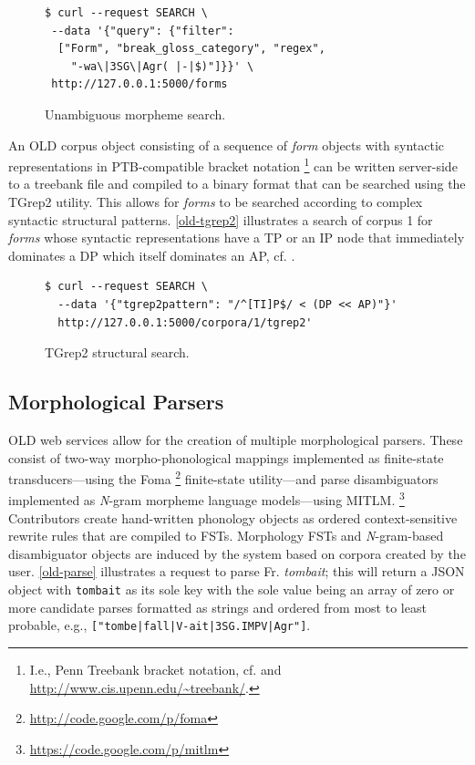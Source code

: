 \documentclass[11pt]{article}
\begin{document}
\begin{figure}[h]
\scriptsize
\begin{verbatim}
$ curl --request SEARCH \
 --data '{"query": {"filter":
  ["Form", "break_gloss_category", "regex",
    "-wa\|3SG\|Agr( |-|$)"]}}' \
 http://127.0.0.1:5000/forms
\end{verbatim}
\normalsize
\caption{Unambiguous morpheme search.}
\label{old-morpheme-search}
\end{figure}

An OLD corpus object consisting of a sequence of \emph{form} objects with syntactic
representations in PTB-compatible bracket notation%
\footnote{I.e., Penn Treebank bracket notation, cf. \cite{taylor2003penn} and
\url{http://www.cis.upenn.edu/~treebank/}.} %
can be written server-side to a treebank file and compiled to a binary format
that can be searched using the TGrep2 utility. This allows for \emph{forms} to be
searched according to complex syntactic structural patterns. \autoref{old-tgrep2}
illustrates a search of corpus 1 for \emph{forms} whose syntactic
representations have a TP or an IP node that immediately dominates a DP which
itself dominates an AP, cf.  \cite{rohde2005tgrep2}.

\begin{figure}[h]
\scriptsize
\begin{verbatim}
$ curl --request SEARCH \
  --data '{"tgrep2pattern": "/^[TI]P$/ < (DP << AP)"}'
  http://127.0.0.1:5000/corpora/1/tgrep2'
\end{verbatim}
\normalsize
\caption{TGrep2 structural search.}
\label{old-tgrep2}
\end{figure}


\subsection{Morphological Parsers}

OLD web services allow for the creation of multiple morphological parsers.
These consist of two-way morpho-phonological mappings implemented as
finite-state transducers---using the Foma%
\footnote{\url{http://code.google.com/p/foma}} %
finite-state utility---and parse disambiguators implemented as \textit{N}-gram
morpheme language models---using MITLM.%
\footnote{\url{https://code.google.com/p/mitlm}}
Contributors create hand-written phonology objects as ordered context-sensitive
rewrite rules that are compiled to FSTs. Morphology FSTs and \textit{N}-gram-based
disambiguator objects are induced by the system based on corpora created by the 
user. \autoref{old-parse} illustrates a request to parse Fr. \textit{tombait};
this will return a JSON object with \texttt{tombait} as its sole key with the 
sole value being an array of zero or more candidate parses formatted as strings and 
ordered from most to least probable, e.g., \texttt{["tombe|fall|V-ait|3SG.IMPV|Agr"]}.
\end{document}

